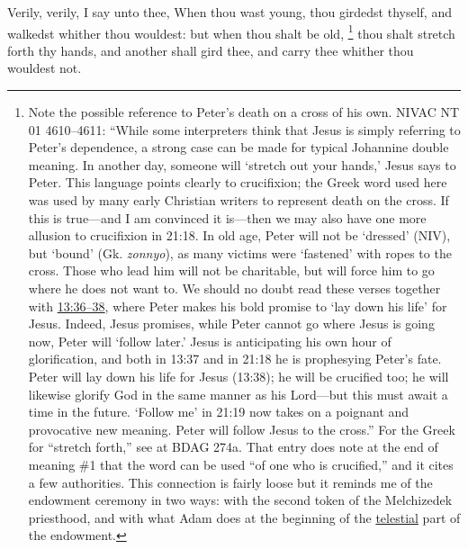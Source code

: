 			Verily, verily, I say unto thee, When thou wast young, thou girdedst thyself, and walkedst whither thou wouldest: but when thou shalt be old,
			\footnote{%
				Note the possible reference to Peter's death on a cross of his own. NIVAC NT 01 4610--4611: ``While some interpreters think that Jesus is simply referring to Peter's dependence, a strong case can be made for typical Johannine double meaning. In another day, someone will `stretch out your hands,' Jesus says to Peter. This language points clearly to crucifixion; the Greek word used here was used by many early Christian writers to represent death on the cross. If this is true---and I am convinced it is---then we may also have one more allusion to crucifixion in 21:18. In old age, Peter will not be `dressed' (NIV), but `bound' (Gk. \textit{zonnyo}), as many victims were `fastened' with ropes to the cross. Those who lead him will not be charitable, but will force him to go where he does not want to. We should no doubt read these verses together with \hyperref[JOHN-13-36]{13:36--38}, where Peter makes his bold promise to `lay down his life' for Jesus. Indeed, Jesus promises, while Peter cannot go where Jesus is going now, Peter will `follow later.' Jesus is anticipating his own hour of glorification, and both in 13:37 and in 21:18 he is prophesying Peter's fate. Peter will lay down his life for Jesus (13:38); he will be crucified too; he will likewise glorify God in the same manner as his Lord---but this must await a time in the future. `Follow me' in 21:19 now takes on a poignant and provocative new meaning. Peter will follow Jesus to the cross.'' For the Greek for ``stretch forth,'' see  at BDAG 274a. That entry does note at the end of meaning \#1 that the word can be used ``of one who is crucified,'' and it cites a few authorities. This connection is fairly loose but it reminds me of the endowment ceremony in two ways: with the second token of the Melchizedek priesthood, and with what Adam does at the beginning of the \hyperref[TEMPLE-ENDOWMENT-ENDOW-PRE-1990-TELESTIAL]{telestial} part of the endowment.
				}%
			thou shalt stretch forth thy hands, and another shall gird thee, and carry thee whither thou wouldest not.

